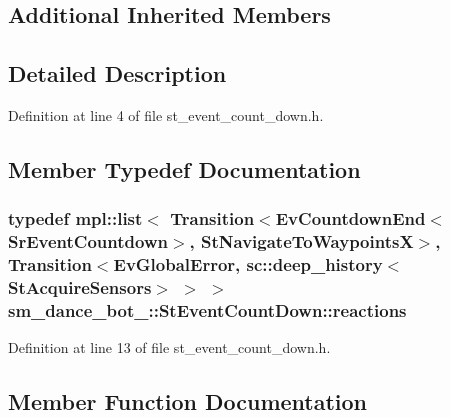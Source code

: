 \subsection*{Additional Inherited Members}


\subsection{Detailed Description}


Definition at line 4 of file st\+\_\+event\+\_\+count\+\_\+down.\+h.



\subsection{Member Typedef Documentation}
\subsubsection[{\texorpdfstring{reactions}{reactions}}]{\setlength{\rightskip}{0pt plus 5cm}typedef mpl\+::list$<$ Transition$<$Ev\+Countdown\+End$<$Sr\+Event\+Countdown$>$, {\bf St\+Navigate\+To\+WaypointsX}$>$, Transition$<${\bf Ev\+Global\+Error}, sc\+::deep\+\_\+history$<${\bf St\+Acquire\+Sensors}$>$ $>$ $>$ {\bf sm\+\_\+dance\+\_\+bot\+\_\+::\+St\+Event\+Count\+Down\+::reactions}}\hypertarget{structsm__dance__bot__3_1_1StEventCountDown_a381755fc445b431bc0bbbf78bb53b274}{}\label{structsm__dance__bot__3_1_1StEventCountDown_a381755fc445b431bc0bbbf78bb53b274}


Definition at line 13 of file st\+\_\+event\+\_\+count\+\_\+down.\+h.



\subsection{Member Function Documentation}
